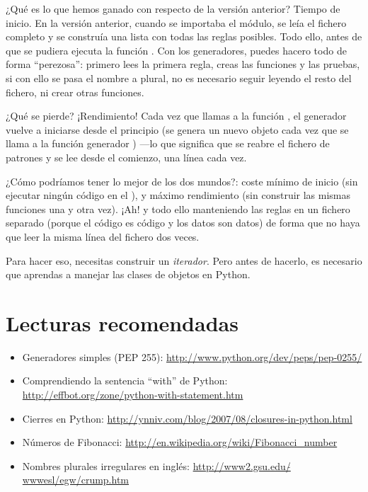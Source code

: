 ¿Qué es lo que hemos ganado con respecto de la versión anterior? Tiempo de inicio. En la versión anterior, cuando se importaba el módulo, se leía el fichero completo y se construía una lista con todas las reglas posibles. Todo ello, antes de que se pudiera ejecuta la función . Con los generadores, puedes hacero todo de forma ``perezosa'': primero lees la primera regla, creas las funciones y las pruebas, si con ello se pasa el nombre a plural, no es necesario seguir leyendo el resto del fichero, ni crear otras funciones.

¿Qué se pierde? ¡Rendimiento! Cada vez que llamas a la función , el generador  vuelve a iniciarse desde el principio (se genera un nuevo objeto cada vez que se llama a la función generador ) ---lo que significa que se reabre el fichero de patrones y se lee desde el comienzo, una línea cada vez.

¿Cómo podríamos tener lo mejor de los dos mundos?: coste mínimo de inicio (sin ejecutar ningún código en el ), y máximo rendimiento (sin construir las mismas funciones una y otra vez). ¡Ah! y todo ello manteniendo las reglas en un fichero separado (porque el código es código y los datos son datos) de forma que no haya que leer la misma línea del fichero dos veces.

Para hacer eso, necesitas construir un \emph{iterador}. Pero antes de hacerlo, es necesario que aprendas a manejar las clases de objetos en Python.

\section{Lecturas recomendadas}

\begin{itemize}

\item Generadores simples (PEP 255): \href{http://www.python.org/dev/peps/pep-0255/}{http://www.python.org/dev/peps/pep-0255/}

\item Comprendiendo la sentencia ``with'' de Python: \href{http://effbot.org/zone/python-with-statement.htm}{http://effbot.org/zone/python-with-statement.htm}

\item Cierres en Python: \href{http://ynniv.com/blog/2007/08/closures-in-python.html}{http://ynniv.com/blog/2007/08/closures-in-python.html}

\item Números de Fibonacci: \href{http://en.wikipedia.org/wiki/Fibonacci\_number}{http://en.wikipedia.org/wiki/Fibonacci\_number}

\item Nombres plurales irregulares en inglés: \href{http://www2.gsu.edu/~wwwesl/egw/crump.htm}{http://www2.gsu.edu/$\tilde{ }$wwwesl/egw/crump.htm}

\end{itemize}

